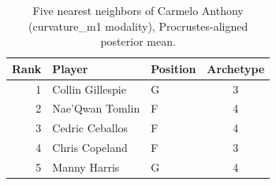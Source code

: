\begin{table}[htbp]
  \centering\small
  \begin{tabular}{rllc}
    \toprule
    Rank & Player & Position & Archetype \\
    \midrule
    1 & Collin Gillespie & G & 3 \\
    2 & Nae'Qwan Tomlin & F & 4 \\
    3 & Cedric Ceballos & F & 4 \\
    4 & Chris Copeland & F & 3 \\
    5 & Manny Harris & G & 4 \\
    \bottomrule
  \end{tabular}
  \caption{Five nearest neighbors of Carmelo Anthony (curvature_m1 modality), Procrustes-aligned posterior mean.}
  \label{tab:Carmelo_Anthony_neighbors_curvature_m1}
\end{table}

